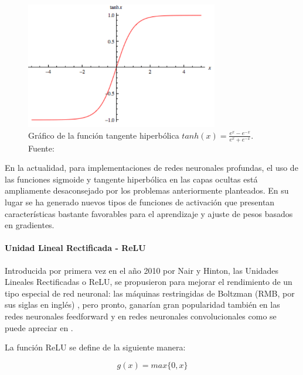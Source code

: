             \begin{figure}[!h] 
                \centering
                \includegraphics[width=0.75\textwidth]{img/tanh}
                \caption[Gráfico de la función tangente hiperbólica]{Gráfico de la función tangente hiperbólica $tanh(x) = \frac{e^x - e^{-x}}{e^x + e^{-x}}$. Fuente: \cite{wang_2016} }
                \label{fig:tanh}
            \end{figure}

            En la actualidad, para implementaciones de redes neuronales profundas, el uso de las funciones sigmoide y tangente 
            hiperbólica en las capas ocultas está ampliamente desaconsejado por los problemas anteriormente planteados. En su 
            lugar se ha generado nuevos tipos de funciones de activación que presentan características bastante favorables 
            para el aprendizaje y ajuste de pesos basados en gradientes.

            \paragraph{Unidad Lineal Rectificada - ReLU}
            Introducida por primera vez en el año 2010 por Nair y Hinton, las Unidades Lineales Rectificadas o ReLU, se 
            propusieron para mejorar el rendimiento de un tipo especial de red neuronal: las máquinas restringidas de Boltzman 
            (RMB, por sus siglas en inglés) \cite{nair2010rectified}, pero pronto, ganarían gran popularidad también en las 
            redes neuronales feedforward y en redes neuronales convolucionales como se puede apreciar en \cite{krizhevsky2012imagenet}.
            
            La función ReLU se define de la siguiente manera:

            \begin{equation}\label{eq:relu}
                g(x) = max\{0,x\}
            \end{equation}

